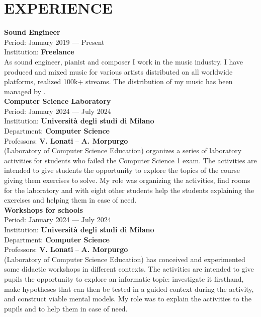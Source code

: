 \documentclass[a4paper,9pt]{extarticle}
\begin{document}

\section*{EXPERIENCE}

\noindent
\newline
\textbf{Sound Engineer} \\
Period: January 2019 --- Present \\
Institution: \textbf{Freelance} \\
As sound engineer, pianist and composer I work in the music industry. I have produced and mixed music for various artists distributed on all worldwide platforms, realized 100k+ streams. The distribution of my music has been managed by \believe. \\

\noindent
\textbf{Computer Science Laboratory} \\
Period: January 2024 --- July 2024 \\
Institution: \textbf{Universit\`a degli studi di Milano} \\
Department: \textbf{Computer Science} \\
Professors: \textbf{V. Lonati} -- \textbf{A. Morpurgo} \\
\aladdin (Laboratory of Computer Science Education) organizes a series of laboratory activities for students who failed the Computer Science 1 exam. The activities are intended to give students the opportunity to explore the topics of the course giving them exercises to solve.
My role was organizing the activities, find rooms for the laboratory and with eight other students help the students explaining the exercises and helping them in case of need. \\

\noindent
\textbf{Workshops for schools} \\
Period: January 2024 --- July 2024 \\
Institution: \textbf{Universit\`a degli studi di Milano} \\
Department: \textbf{Computer Science} \\
Professors: \textbf{V. Lonati} -- \textbf{A. Morpurgo} \\
\aladdin (Laboratory of Computer Science Education) has conceived and experimented some didactic workshops in different contexts.  The activities are intended to give pupils the opportunity to explore an informatic topic: investigate it firsthand, make hypotheses that can then be tested in a guided context during the activity, and construct viable mental models. My role was to explain the activities to the pupils and to help them in case of need. \\
\end{document}
